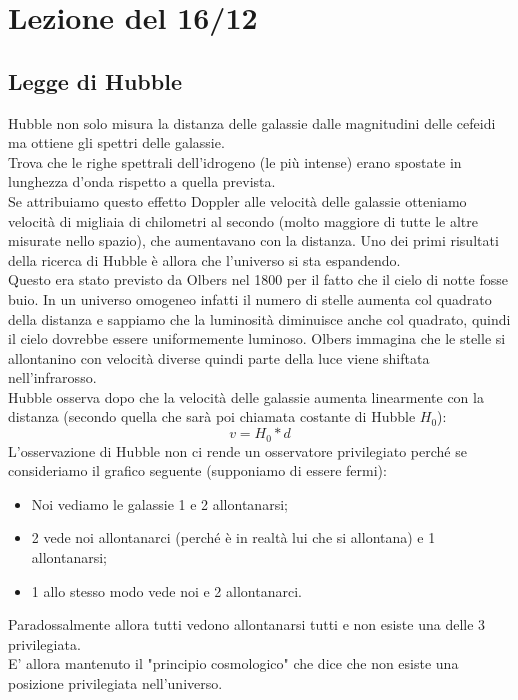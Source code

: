 \documentclass[a4paper,11pt]{article}
\begin{document}
\newpage
\section{Lezione del 16/12}
\subsection{Legge di Hubble}
Hubble non solo misura la distanza delle galassie dalle magnitudini delle cefeidi ma ottiene gli spettri delle galassie. \\
Trova che le righe spettrali dell'idrogeno (le più intense) erano spostate in lunghezza d'onda rispetto a quella prevista. \\
Se attribuiamo questo effetto Doppler alle velocità delle galassie otteniamo velocità di migliaia di chilometri al secondo (molto maggiore di tutte le altre misurate nello spazio), che aumentavano con la distanza. Uno dei primi risultati della ricerca di Hubble è allora che l'universo si sta espandendo. \\
Questo era stato previsto da Olbers nel 1800 per il fatto che il cielo di notte fosse buio. In un universo omogeneo infatti il numero di stelle aumenta col quadrato della distanza e sappiamo che la luminosità diminuisce anche col quadrato, quindi il cielo dovrebbe essere uniformemente luminoso. Olbers immagina che le stelle si allontanino con velocità diverse quindi parte della luce viene shiftata nell'infrarosso. \\
Hubble osserva dopo che la velocità delle galassie aumenta linearmente con la distanza (secondo quella che sarà poi chiamata costante di Hubble $H_0$): \\
\begin{equation}
    v=H_0*d
\end{equation}
L'osservazione di Hubble non ci rende un osservatore privilegiato perché se consideriamo il grafico seguente (supponiamo di essere fermi):\\
\begin{itemize}
    \item Noi vediamo le galassie 1 e 2 allontanarsi;
    \item 2 vede noi allontanarci (perché è in realtà lui che si allontana) e 1 allontanarsi;
    \item 1 allo stesso modo vede noi e 2 allontanarci.
\end{itemize}
Paradossalmente allora tutti vedono allontanarsi tutti e non esiste una delle 3 privilegiata. \\
E' allora mantenuto il "principio cosmologico" che dice che non esiste una posizione privilegiata nell'universo. \\
\end{document}
